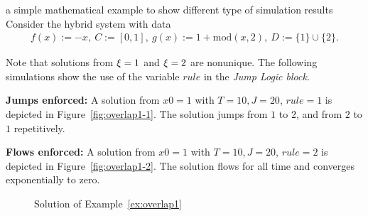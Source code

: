 
\begin{example}{a simple mathematical example to show different type of simulation results}
\label{ex:overlap1}
Consider the hybrid system with data
\begin{eqnarray*}
f(x) := -x,\ C:= [0,1], \
g(x) := 1+\mbox{mod}(x,2), \ D:=  \{1\}\cup\{2\}.
\end{eqnarray*}

Note that solutions from $\xi = 1$ and $\xi = 2$ are
nonunique.  The following simulations show the use of the variable
$rule$ in the {\em Jump Logic block}.

{\bf Jumps enforced:}
A solution from $x0=1$ with $T=10,J=20$, $rule = 1$ is depicted in
Figure~\ref{fig:overlap1-1}. The solution jumps from $1$ to
$2$, and from $2$ to $1$ repetitively.

{\bf Flows enforced:}
A solution from $x0=1$ with $T=10,J=20$, $rule = 2$ is depicted in
Figure~\ref{fig:overlap1-2}. The solution flows for all time
and converges exponentially to zero.

\begin{figure}[ht]
\begin{center}
\hfill
{}
\end{center}
\caption{Solution of Example~\ref{ex:overlap1}}
\end{figure}


\end{example}
